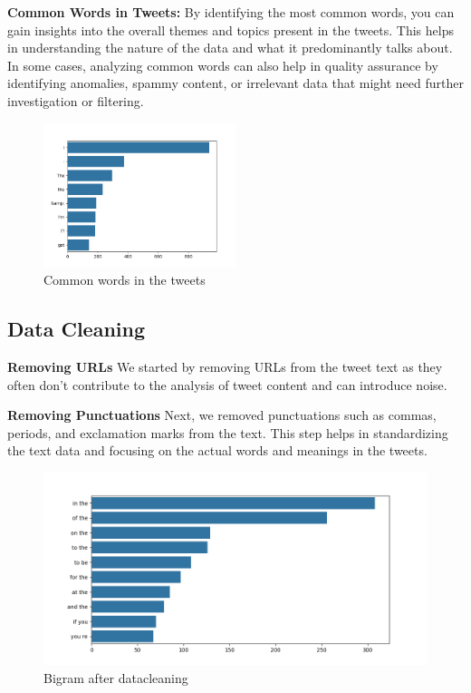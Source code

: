 \newpage
\textbf{Common Words in Tweets:}
By identifying the most common words, you can gain insights into the overall themes and topics present in the tweets. This helps in understanding the nature of the data and what it predominantly talks about. In some cases, analyzing common words can also help in quality assurance by identifying anomalies, spammy content, or irrelevant data that might need further investigation or filtering.
\begin{figure}[h]
    \centering
    \includegraphics[width=0.5\textwidth]{figures/commonwords.png}
    \caption{Common words in the tweets}
\end{figure}


\clearpage
\subsection{Data Cleaning}

\textbf{Removing URLs}
We started by removing URLs from the tweet text as they often don't contribute to the analysis of tweet content and can introduce noise.

\textbf{Removing Punctuations}
Next, we removed punctuations such as commas, periods, and exclamation marks from the text. This step helps in standardizing the text data and focusing on the actual words and meanings in the tweets.
\begin{figure}[ht]
    \centering
    \includegraphics[scale=0.7]{figures/CleanedDatabigram.png}
    \caption{Bigram after datacleaning}
\end{figure}

